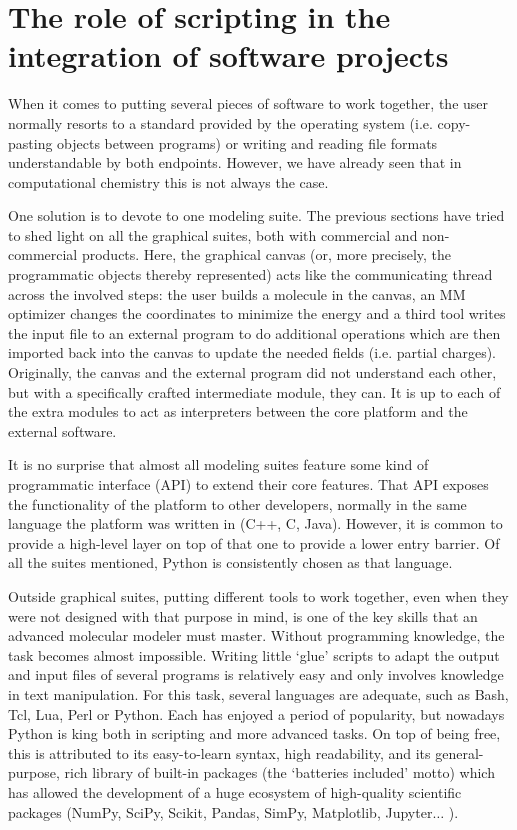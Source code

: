 

\section{The role of scripting in the integration of software projects}
When it comes to putting several pieces of software to work together, the user normally resorts to a standard provided by the operating system (i.e. copy-pasting objects between programs) or writing and reading file formats understandable by both endpoints. However, we have already seen that in computational chemistry this is not always the case.

One solution is to devote to one modeling suite. The previous sections have tried to shed light on all the graphical suites, both with commercial and non-commercial products. Here, the graphical canvas (or, more precisely, the programmatic objects thereby represented) acts like the communicating thread across the involved steps: the user builds a molecule in the canvas, an MM optimizer changes the coordinates to minimize the energy and a third tool writes the input file to an external program to do additional operations which are then imported back into the canvas to update the needed fields (i.e. partial charges). Originally, the canvas and the external program did not understand each other, but with a specifically crafted intermediate module, they can. It is up to each of the extra modules to act as interpreters between the core platform and the external software.

It is no surprise that almost all modeling suites feature some kind of programmatic interface (API) to extend their core features. That API exposes the functionality of the platform to other developers, normally in the same language the platform was written in (C++, C, Java). However, it is common to provide a high-level layer on top of that one to provide a lower entry barrier. Of all the suites mentioned, Python is consistently chosen as that language.

Outside graphical suites, putting different tools to work together, even when they were not designed with that purpose in mind, is one of the key skills that an advanced molecular modeler must master. Without programming knowledge, the task becomes almost impossible. Writing little ‘glue’ scripts to adapt the output and input files of several programs is relatively easy and only involves knowledge in text manipulation. For this task, several languages are adequate, such as Bash, Tcl, Lua, Perl or Python. Each has enjoyed a period of popularity, but nowadays Python is king both in scripting and more advanced tasks. On top of being free, this is attributed to its easy-to-learn syntax, high readability, and its general-purpose, rich library of built-in packages (the ‘batteries included’ motto) which has allowed the development of a huge ecosystem of high-quality scientific packages (NumPy, SciPy, Scikit, Pandas, SimPy, Matplotlib, Jupyter$ \ldots $ ).

